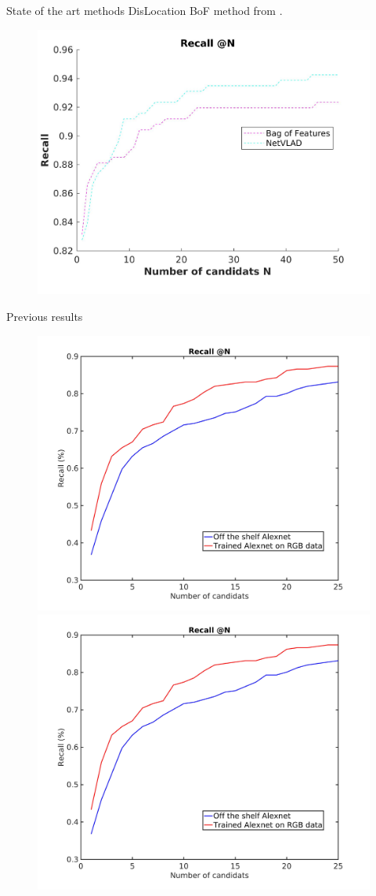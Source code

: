 \begin{frame}{State of the art methods}
	DisLocation BoF method from \cite{Arandjelovic2014a}.
	\vfill
	\begin{figure}[c]
		\includegraphics[width=0.8\linewidth]{images/annexe/sota_result.jpg}
	\end{figure}
	\vfill

\end{frame}

\begin{frame}{Previous results}

	\vfill
	\begin{figure}[c]
		\includegraphics[width=0.45\linewidth]{images/result.jpg}
		\includegraphics[width=0.45\linewidth]{images/result.jpg}
	\end{figure}
	\vfill

\end{frame}
